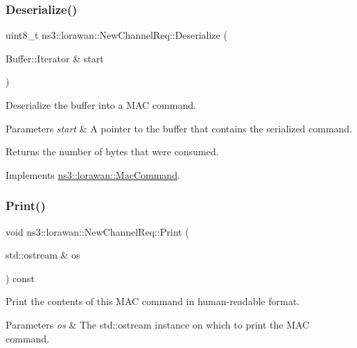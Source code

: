 \subsubsection{\texorpdfstring{Deserialize()}{Deserialize()}}
{\footnotesize\ttfamily uint8\+\_\+t ns3\+::lorawan\+::\+New\+Channel\+Req\+::\+Deserialize (\begin{DoxyParamCaption}\item[{Buffer\+::\+Iterator \&}]{start }\end{DoxyParamCaption})\hspace{0.3cm}{\ttfamily [virtual]}}

Deserialize the buffer into a M\+AC command.


\begin{DoxyParams}{Parameters}
{\em start} & A pointer to the buffer that contains the serialized command. \\
\hline
\end{DoxyParams}
\begin{DoxyReturn}{Returns}
the number of bytes that were consumed. 
\end{DoxyReturn}


Implements \hyperlink{classns3_1_1lorawan_1_1MacCommand_af12d223a71a67196bce498f1240eda75}{ns3\+::lorawan\+::\+Mac\+Command}.

\mbox{\label{classns3_1_1lorawan_1_1NewChannelReq_af60960cdfafc846b66a657a25678f90e}} 
\subsubsection{\texorpdfstring{Print()}{Print()}}
{\footnotesize\ttfamily void ns3\+::lorawan\+::\+New\+Channel\+Req\+::\+Print (\begin{DoxyParamCaption}\item[{std\+::ostream \&}]{os }\end{DoxyParamCaption}) const\hspace{0.3cm}{\ttfamily [virtual]}}

Print the contents of this M\+AC command in human-\/readable format.


\begin{DoxyParams}{Parameters}
{\em os} & The std\+::ostream instance on which to print the M\+AC command. \\
\hline
\end{DoxyParams}


